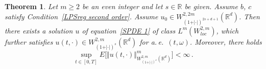 \documentclass[a4paper,10pt]{article}
\newtheorem{theorem}{Theorem}
\begin{document}
\begin{theorem}
\label{Theo existence regular sol second order}Let $m\geq2$ be an even
integer and let $s\in\mathbb{R}$ be given. Assume $b$, $c$ satisfy Condition~\ref{LPSreg second order}. Assume $u_{0}\in W_{(1+\vert \cdot\vert )^{2s+d+1}}^{2,2m}(\mathbb{R}^{d})$. Then there exists a solution $u$ of
equation~\eqref{SPDE 1} of class $L^{m}(W_{loc}^{2,m})$, 
which further satisfies $u(t,\cdot)\in W_{(1+\vert \cdot \vert)^{s}}^{2,m}(\mathbb{R}^{d})$ for a.\,e.\ $(t,\omega)$. Moreover, there holds
\begin{equation*}
\sup_{t\in[  0,T]  }E\Big[  \Vert u(t,\cdot) \Vert_{W_{(1+ \vert \cdot \vert)^{s}}^{2,m}(
\mathbb{R}^{d})}^{m}\Big]  <\infty \,. 
\end{equation*}
\end{theorem}
\end{document}
